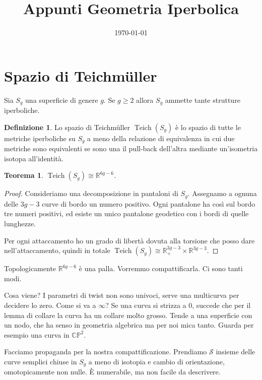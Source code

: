 \documentclass[a4paper]{article}
\title{Appunti Geometria Iperbolica}
\date{\today}
\newtheorem{theorem}{Teorema}
\theoremstyle{definition}
\newtheorem{definition}{Definizione}
\DeclareMathOperator{\Teich}{Teich}
\begin{document}
    \maketitle
    
\section{Spazio di Teichmüller}

    Sia $S_g$ una superficie di genere $g$. Se $g \geq 2$ allora $S_g$ ammette tante strutture iperboliche.

    \begin{definition}
        Lo spazio di Teichmüller $\Teich(S_g)$ è lo spazio di tutte le metriche iperboliche su $S_g$ a meno della relazione di equivalenza in cui due metriche sono equivalenti se sono una il pull-back dell'altra mediante un'isometria isotopa all'identità.
    \end{definition}

    \begin{theorem}
        $\Teich(S_g) \cong \mathbb R^{6g-6}$.
    \end{theorem}

    \begin{proof}
        Consideriamo una decomposizione in pantaloni di $S_g$. Assegnamo a ognuna delle $3g - 3$ curve di bordo un numero positivo. Ogni pantalone ha così sul bordo tre numeri positivi, ed esiste un unico pantalone geodetico con i bordi di quelle lunghezze.

        Per ogni attaccamento ho un grado di libertà dovuta alla torsione che posso dare nell'attaccamento, quindi in totale $\Teich(S_g) \cong \mathbb R_+^{3g - 3} \times \mathbb R^{3g - 3}$.
    \end{proof}
    
    Topologicamente $\mathbb R^{6g-6}$ è una palla. Vorremmo compattificarla. Ci sono tanti modi.

    Cosa viene? I parametri di twist non sono univoci, serve una multicurva per decidere lo zero. Come si va a $\infty$? Se una curva si strizza a $0$, succede che per il lemma di collare la curva ha un collare molto grosso. Tende a una superficie con un nodo, che ha senso in geometria algebrica ma per noi mica tanto. Guarda per esempio una curva in $\mathbb {CP}^2$.

    Facciamo propaganda per la nostra compattificazione. Prendiamo $\mathcal S$ insieme delle curve semplici chiuse in $S_g$ a meno di isotopia e cambio di orientazione, omotopicamente non nulle. È numerabile, ma non facile da descrivere.
\end{document}
